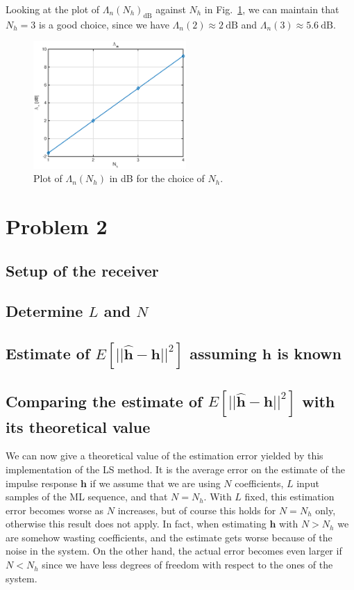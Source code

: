 \documentclass[10pt]{article}
\newcommand{\dB} {\mathrm{dB}}
\numberwithin{equation}{section}
\begin{document}
Looking at the plot of $\Lambda_n (N_h)_{\dB}$ against $N_h$ in Fig.~\ref{fig:p01_lambda_n}, we can maintain that $N_h = 3$ is a good choice, since we have $\Lambda_n(2) \approx 2~\dB$ and $\Lambda_n(3) \approx 5.6~\dB$.

\begin{figure}[ht]
	\centering
	\includegraphics[width=0.52\textwidth]{p01_lambda_n}
	\caption{Plot of $\Lambda_n (N_h)$ in dB for the choice of $N_h$.}
    \label{fig:p01_lambda_n}
\end{figure}


\section*{Problem 2}

\subsection*{Setup of the receiver}
\subsection*{Determine $L$ and $N$}
\subsection*{Estimate of $E[||\mathbf{\hat{h}}-\mathbf{h}||^2]$ assuming $\mathbf{h}$ is known}

\subsection*{Comparing the estimate of $E[||\mathbf{\hat{h}}-\mathbf{h}||^2]$ with its theoretical value}

We can now give a theoretical value of the estimation error yielded by this implementation of the LS method. It is the average error on the estimate of the impulse response $\mathbf{h}$ if we assume that we are using $N$ coefficients, $L$ input samples of the ML sequence, and that $N=N_h$. With $L$ fixed, this estimation error becomes worse as $N$ increases, but of course this holds for $N=N_h$ only, otherwise this result does not apply. In fact, when estimating $\mathbf{h}$ with $N>N_h$ we are somehow wasting coefficients, and the estimate gets worse because of the noise in the system. On the other hand, the actual error becomes even larger if $N<N_h$ since we have less degrees of freedom with respect to the ones of the system.
\end{document}
